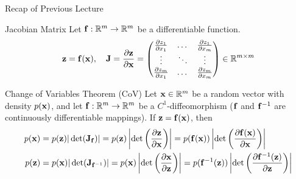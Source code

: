 \documentclass{beamer}
\begin{document}
\begin{frame}
	\titlepage
	\resetonslide
\end{frame}
\begin{frame}{Recap of Previous Lecture}
    \begin{block}{Jacobian Matrix}
		Let $\mathbf{f}: \mathbb{R}^m \rightarrow \mathbb{R}^m$ be a differentiable function.
		\[
			\mathbf{z} = \mathbf{f}(\mathbf{x}), \quad 
			\mathbf{J} =  \frac{\partial \mathbf{z}}{\partial \mathbf{x}} =
			\begin{pmatrix}
				\frac{\partial z_1}{\partial x_1} & \dots & \frac{\partial z_1}{\partial x_m} \\
				\vdots & \ddots & \vdots \\ 
				\frac{\partial z_m}{\partial x_1} & \dots & \frac{\partial z_m}{\partial x_m}
			\end{pmatrix} \in \mathbb{R}^{m \times m}
		\]
		\vspace{-0.3cm}
	\end{block}
	\begin{block}{Change of Variables Theorem (CoV)}
		Let $\mathbf{x}\in \mathbb{R}^m$ be a random vector with density $p(\mathbf{x})$, and let $\mathbf{f}: \mathbb{R}^m \rightarrow \mathbb{R}^m$ be a $C^1$-diffeomorphism ($\mathbf{f}$ and $\mathbf{f}^{-1}$ are continuously differentiable mappings). 
		If $\mathbf{z} = \mathbf{f}(\mathbf{x})$, then
		\begin{align*}
			p(\mathbf{x}) &= p(\mathbf{z}) |\det(\mathbf{J}_{\mathbf{f}})| = p(\mathbf{z}) \left|\det \left( \frac{\partial \mathbf{z}}{\partial \mathbf{x}} \right) \right| 
			= p(\mathbf{f}(\mathbf{x})) \left|\det \left(  \frac{\partial \mathbf{f}(\mathbf{x})}{\partial \mathbf{x}} \right) \right| \\
			p(\mathbf{z}) &= p(\mathbf{x}) |\det(\mathbf{J}_{\mathbf{f}^{-1}})| = p(\mathbf{x}) \left|\det \left(  \frac{\partial \mathbf{x}}{\partial \mathbf{z}} \right) \right| 
			= p(\mathbf{f}^{-1}(\mathbf{z})) \left|\det \left(  \frac{\partial \mathbf{f}^{-1}(\mathbf{z})}{\partial \mathbf{z}} \right) \right|
		\end{align*}
		\vspace{-0.5cm}
	\end{block}
\end{frame}
\end{document}
